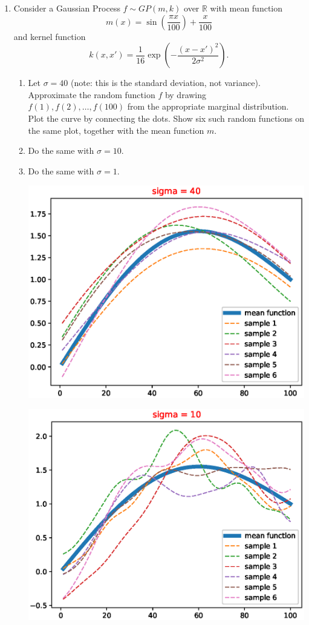 \documentclass{article}
\def\R{\mathbb R}
\begin{document}
\begin{enumerate}
\begin{enumerate}
\color{black}

\end{enumerate}

\item 



Consider a Gaussian Process $f \sim GP(m,k)$ over $\R$ with mean function
$$m(x) = \sin(\frac{\pi x}{100}) + \frac{x}{100}$$
and kernel function
$$k(x,x') = \frac{1}{16}\exp\left( -\frac{(x-x')^2}{2\sigma^2} \right).$$
\begin{enumerate}
\item
Let $\sigma=40$ (note: this is the standard deviation, not variance).  Approximate the random function $f$ by drawing $f(1), f(2), \ldots, f(100)$ from the appropriate marginal distribution.  Plot the curve by connecting the dots.
Show six such random functions on the same plot, together with the mean function $m$.
\item Do the same with $\sigma=10$.
\item Do the same with $\sigma=1$.

\hspace*{-4cm}
\includegraphics[scale=1]{gp_40}

\hspace*{-4cm}
\includegraphics[scale=1]{gp_10}


\end{enumerate}
\end{enumerate}
\end{document}
